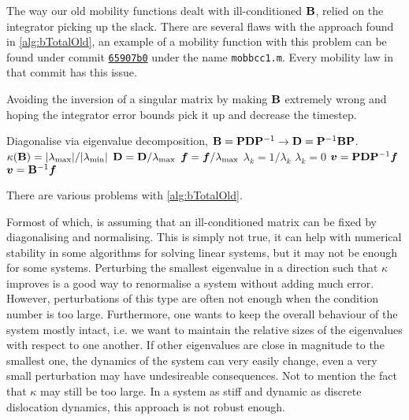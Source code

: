 The way our old mobility functions dealt with ill-conditioned $\mathbf{B}$, relied on the integrator picking up the slack. There are several flaws with the approach found in \cref{alg:bTotalOld}, an example of a mobility function with this problem can be found under commit \href{https://github.com/TarletonGroup/EasyDD/blob/65907b022d1fe408fc1b2e5c5ca2bd1797ccae04/mobbcc1.m#L68}{\texttt{65907b0}} under the name \texttt{mobbcc1.m}. Every mobility law in that commit has this issue.
\begin{algorithm}
  \caption[Bad way of avoiding drag matrix inversion singularity.]{Avoiding the inversion of a singular matrix by making $\mathbf{B}$ extremely wrong and hoping the integrator error bounds pick it up and decrease the timestep.}
  \label{alg:bTotalOld}
  \begin{algorithmic}
    \State Diagonalise via eigenvalue decomposition, $\mathbf{B} = \mathbf{P} \mathbf{D} \mathbf{P}^{-1} \to \mathbf{D} = \mathbf{P}^{-1} \mathbf{B} \mathbf{P}$.
    \State $\kappa(\mathbf{B}) = \lvert \lambda_{\textrm{max}} \rvert/ \lvert \lambda_{\textrm{min}} \rvert$
    \State $\mathbf{D} = \mathbf{D} / \lambda_{\textrm{max}}$
    \State $\vec{f} = \vec{f} / \lambda_{\rvar{max}}$
    \State $\lambda_k = 1/\lambda_k$
    \Else
    \State $\lambda_k = 0$
    \EndIf
    \EndFor
    \State $\vec{v} = \mtx{P} \mtx{D} \mtx{P}^{-1} \vec{f}$
    \Else
    \State $\vec{v} = \mtx{B}^{-1} \vec{f}$
    \EndIf
  \end{algorithmic}
\end{algorithm}
There are various problems with \cref{alg:bTotalOld}.

Formost of which, is assuming that an ill-conditioned matrix can be fixed by diagonalising and normalising. This is simply not true, it can help with numerical stability in some algorithms for solving linear systems, but it may not be enough for some systems. Perturbing the smallest eigenvalue in a direction such that $\kappa$ improves is a good way to renormalise a system without adding much error. However, perturbations of this type are often not enough when the condition number is too large. Furthermore, one wants to keep the overall behaviour of the system mostly intact, i.e. we want to maintain the relative sizes of the eigenvalues with respect to one another. If other eigenvalues are close in magnitude to the smallest one, the dynamics of the system can very easily change, even a very small perturbation may have undesireable consequences. Not to mention the fact that $\kappa$ may still be too large. In a system as stiff and dynamic as discrete dislocation dynamics, this approach is not robust enough.

